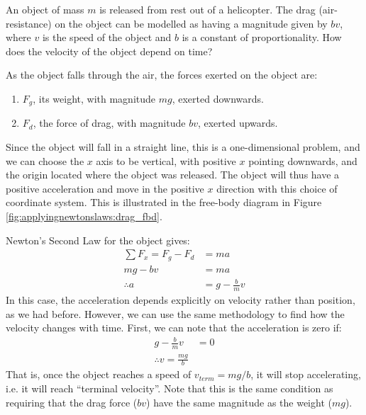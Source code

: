 \begin{example}{An object of mass $m$ is released from rest out of a helicopter. The drag (air-resistance) on the object can be modelled as having a magnitude given by $bv$, where $v$ is the speed of the object and $b$ is a constant of proportionality. How does the velocity of the object depend on time?}

\label{ex:applyingnewtonslaws:drag}
As the object falls through the air, the forces exerted on the object are:
\begin{enumerate}
\item $F_g$, its weight, with magnitude $mg$, exerted downwards.
\item $F_d$, the force of drag, with magnitude $bv$, exerted upwards. 
\end{enumerate}
Since the object will fall in a straight line, this is a one-dimensional problem, and we can choose the $x$ axis to be vertical, with positive $x$ pointing downwards, and the origin located where the object was released. The object will thus have a positive acceleration and move in the positive $x$ direction with this choice of coordinate system. This is illustrated in the free-body diagram in Figure \ref{fig:applyingnewtonslaws:drag_fbd}.

Newton's Second Law for the object gives:
\begin{align*}
\sum F_x = F_g - F_d &= ma\\
mg - bv &= ma\\
\therefore a &= g-\frac{b}{m}v 
\end{align*}
In this case, the acceleration depends explicitly on velocity rather than position, as we had before. However, we can use the same methodology to find how the velocity changes with time. First, we can note that the acceleration is zero if:
\begin{align*}
g-\frac{b}{m}v &=0\\
\therefore v = \frac{mg}{b}
\end{align*}
That is, once the object reaches a speed of $v_{term}=mg/b$, it will stop accelerating, i.e. it will reach ``terminal velocity''. Note that this is the same condition as requiring that the drag force ($bv$) have the same magnitude as the weight ($mg$).


\end{example}
